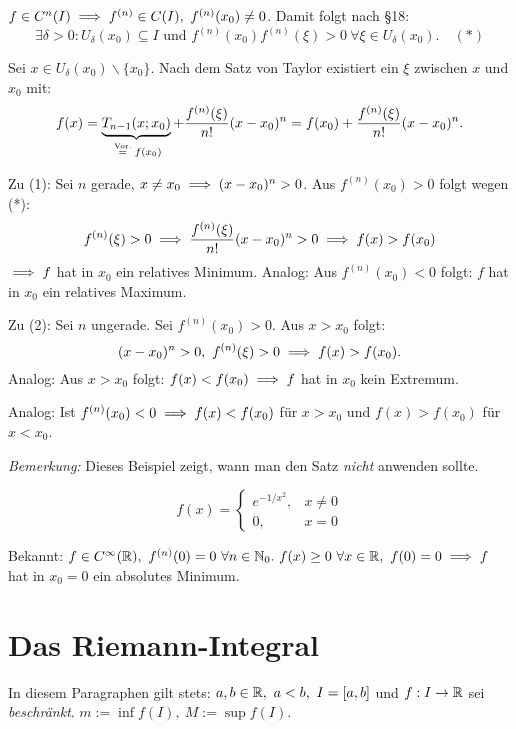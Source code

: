 \documentclass[a4paper,twoside,DIV15,BCOR12mm]{scrbook}
\begin{document}
\begin{beweis}
$f \in C^n(I) \folgt f^{(n)} \in C(I),\ f^{(n)}(x_0) \ne 0$. Damit folgt nach §18:
$$\exists \delta > 0: U_\delta(x_0) \subseteq I\text{ und }f^{(n)}(x_0) f^{(n)}(\xi) > 0\ \forall \xi \in U_\delta(x_0).\quad(*)$$

Sei $x\in U_\delta(x_0)\backslash \{x_0\}$. Nach dem Satz von Taylor existiert ein $\xi$ zwischen $x$ und $x_0$ mit:
$$f(x) = \underbrace{T_{n-1}(x;x_0)}_{\gleichnach{Vor.} f(x_0)} + \frac{f^{(n)}(\xi)}{n!}(x-x_0)^n = f(x_0) + \frac{f^{(n)}(\xi)}{n!}(x-x_0)^n.$$

Zu (1): Sei $n$ gerade, $x \ne x_0 \implies (x-x_0)^n > 0$. Aus $f^{(n)}(x_0) > 0$ folgt wegen (*):
$$f^{(n)}(\xi) > 0 \implies \frac{f^{(n)}(\xi)}{n!}(x-x_0)^n > 0 \implies f(x) > f(x_0)$$
$\implies f$ hat in $x_0$ ein relatives Minimum. Analog: Aus $f^{(n)}(x_0) < 0$ folgt: $f$ hat in $x_0$ ein relatives Maximum.

Zu (2): Sei $n$ ungerade. Sei $f^{(n)}(x_0) > 0$. Aus $x > x_0$ folgt:
$$(x-x_0)^n > 0,\ f^{(n)}(\xi) > 0 \implies f(x) > f(x_0).$$
Analog: Aus $x > x_0$ folgt: $f(x) < f(x_0) \implies f$ hat in $x_0$ kein Extremum.

Analog: Ist $f^{(n)}(x_0) < 0 \implies f(x) < f(x_0)$ für $x > x_0$ und $f(x) > f(x_0)$ für $x < x_0$.
\end{beweis}

\begin{beispiel}
\emph{Bemerkung:} Dieses Beispiel zeigt, wann man den Satz \emph{nicht} anwenden sollte.

$$f(x) = \begin{cases}
e^{-1/x^2},& x \ne 0\\
0,& x=0
\end{cases}$$

Bekannt: $f \in C^\infty(\mathbb{R}),\ f^{(n)}(0) = 0\ \forall n \in \mathbb{N}_0.\ f(x) \ge 0\ \forall x \in \mathbb{R},\ f(0) = 0 \implies f$ hat in $x_0 = 0$ ein absolutes Minimum.
\end{beispiel}


\theoremstyle{nonumberbreak}
\newtheorem{merkregel}{Merkregel}

\chapter{Das Riemann-Integral}

In diesem Paragraphen gilt stets: $a,b \in \mathbb{R},\ a<b,\ I = [a,b]$ und $f: I \to \mathbb{R}$ sei \emph{beschränkt}. $m := \inf f(I),\ M := \sup f(I)$.
\end{document}
